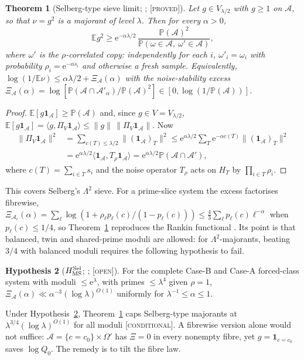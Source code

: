 \documentclass[10pt,reqno]{amsart}
\newtheorem{theorem}{Theorem}[section]
\theoremstyle{definition}
\newtheorem{hypothesis}[theorem]{Hypothesis}
\theoremstyle{remark}
\newcommand{\A}{\mathcal A}
\newcommand{\E}{\mathbb E}
\newcommand{\Prob}{\mathbb P}
\newcommand{\ind}{\mathbf 1}
\newcommand{\e}{\mathrm e}
\newcommand{\lab}[1]{\textup{[\textsc{#1}]}}
\begin{document}
\begin{theorem}[Selberg-type sieve limit; {\cite[Thm~5.5]{ET}}; \lab{proved}]\label{thm:L2}
Let $g\in V_{\lambda/2}$ with $g\geq1$ on $\A$, so that $\nu=g^2$ is a
majorant of level $\lambda$.  Then for every $\alpha>0$,
\[
 \E g^2\geq\e^{-\alpha\lambda/2}\,\frac{\Prob(\A)^2}{\Prob(\omega\in\A,\ \omega'\in\A)},
\]
where $\omega'$ is the $\rho$-correlated copy: independently for each $i$,
$\omega'_i=\omega_i$ with probability $\rho_i=\e^{-\alpha s_i}$ and otherwise a
fresh sample.  Equivalently, $\log(1/\E\nu)\leq\alpha\lambda/2+\Xi_\A(\alpha)$
with the \emph{noise-stability excess}
$\Xi_\A(\alpha)=\log[\Prob(\A\cap\A'_\alpha)/\Prob(\A)^2]\in[0,\log(1/\Prob(\A))]$.
\end{theorem}
\begin{proof}
$\E[g\ind_\A]\geq\Prob(\A)$ and, since $g\in V=V_{\lambda/2}$,
$\E[g\ind_\A]=\langle g,\Pi_V\ind_\A\rangle\leq\|g\|\,\|\Pi_V\ind_\A\|$.  Now
\[
 \begin{aligned}
 \|\Pi_V\ind_\A\|^2&=\sum_{c(T)\leq\lambda/2}\|(\ind_\A)_T\|^2
 \leq\e^{\alpha\lambda/2}\sum_T\e^{-\alpha c(T)}\|(\ind_\A)_T\|^2\\
 &=\e^{\alpha\lambda/2}\langle\ind_\A,T_\rho\ind_\A\rangle
 =\e^{\alpha\lambda/2}\Prob(\A\cap\A'),
 \end{aligned}
\]
where $c(T)=\sum_{i\in T}s_i$ and
the noise operator $T_\rho$ acts on $H_T$ by $\prod_{i\in T}\rho_i$.
\end{proof}
This covers Selberg's $\Lambda^2$ sieve.  For a prime-slice system the
excess factorises fibrewise,
$\Xi_{\A_c}(\alpha)=\sum_\ell\log(1+\rho_\ell p_\ell(c)/(1-p_\ell(c)))
\leq\frac43\sum_\ell p_\ell(c)\ell^{-\alpha}$ when $p_\ell(c)\leq1/4$, so
Theorem~\ref{thm:L2} reproduces the Rankin functional \cite[Cor.~5.6]{ET}.
Its point is that balanced, twin and shared-prime moduli are allowed: for
$\Lambda^2$-majorants, beating $3/4$ with balanced moduli requires the
following hypothesis to fail.

\begin{hypothesis}[$H_{\rm MS}^{\rm Sel}$; {\cite[\S5.7]{ET}}; \lab{open}]\label{hyp:MSsel}
For the complete Case-B and Case-A forced-class system with moduli
$\leq\e^\lambda$, with primes $\leq\lambda^4$ given $\rho=1$,
$\Xi_\A(\alpha)\ll\alpha^{-3}(\log\lambda)^{O(1)}$ uniformly for
$\lambda^{-1}\leq\alpha\leq1$.
\end{hypothesis}
Under Hypothesis~\ref{hyp:MSsel}, Theorem~\ref{thm:L2} caps Selberg-type
majorants at $\lambda^{3/4}(\log\lambda)^{O(1)}$ for all moduli
\lab{conditional}.
A fibrewise version alone would not suffice: $\A=\{c=c_0\}\times\Omega'$
has $\Xi=0$ in every nonempty fibre, yet $g=\ind_{c=c_0}$ saves $\log Q_0$.
The remedy is to tilt the fibre law.
\end{document}
